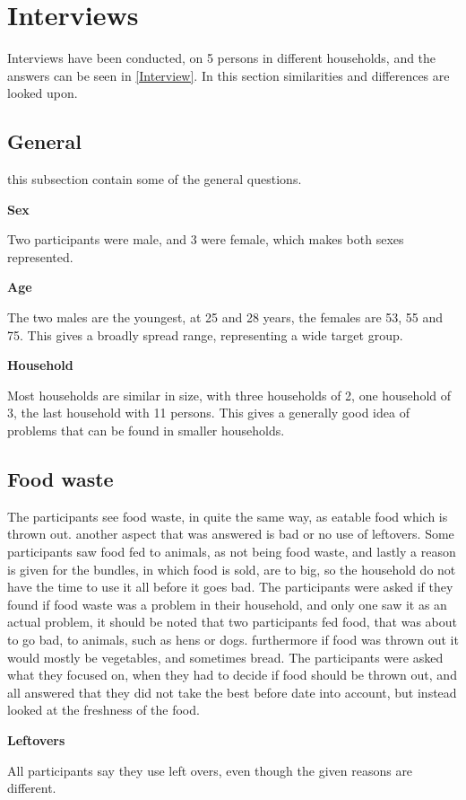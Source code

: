 \section{Interviews}
Interviews have been conducted, on 5 persons in different households, and the answers can be seen in \cref{Interview}. In this section similarities and differences are looked upon.

\subsection{General}
this subsection contain some of the general questions.

\textbf{Sex}

Two participants were male, and 3 were female, which makes both sexes represented.

\textbf{Age}

The two males are the youngest, at 25 and 28 years, the females are 53, 55 and 75. This gives a broadly spread range, representing a wide target group.

\textbf{Household}

Most households are similar in size, with three households of 2, one household of 3, the last household with 11 persons. This gives a generally good idea of problems that can be found in smaller households.
\subsection{Food waste}
The participants see food waste, in quite the same way, as eatable food which is thrown out. another aspect that was answered is bad or no use of leftovers. Some participants saw food fed to animals, as not being food waste, and lastly a reason is given for the bundles, in which food is sold, are to big, so the household do not have the time to use it all before it goes bad. The participants were asked if they found if food waste was a problem in their household, and only one saw it as an actual problem, it should be noted that two participants fed food, that was about to go bad,  to animals, such as hens or dogs. furthermore if food was thrown out it would mostly be vegetables, and sometimes bread. The participants were asked what they focused on, when they had to decide if food should be thrown out, and all answered that they did not take the best before date into account, but instead looked at the freshness of the food.

\textbf{Leftovers}

All participants say they use left overs, even though the given reasons are different.
